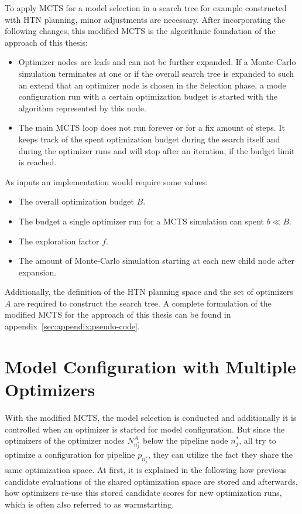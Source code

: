 To apply MCTS for a model selection in a search tree for example constructed with HTN planning, minor adjustments are necessary.
After incorporating the following changes, this modified MCTS is the algorithmic foundation of the approach of this thesis:
\begin{itemize}
    \item Optimizer nodes are leafs and can not be further expanded. If a Monte-Carlo simulation terminates at one or if the overall search tree is expanded to such an extend that an optimizer node is chosen in the Selection phase, a mode configuration run with a certain optimization budget is started with the algorithm represented by this node.
    \item The main MCTS loop does not run forever or for a fix amount of steps. It keeps track of the spent optimization budget during the search itself and during the optimizer runs and will stop after an iteration, if the budget limit is reached.
\end{itemize}
As inputs an implementation would require  some values:
\begin{itemize}
    \item The overall optimization budget $B$.
    \item The budget a single optimizer run for a MCTS simulation can spent $b \ll B$.
    \item The exploration factor $f$.
    \item The amount of Monte-Carlo simulation starting at each new child node after expansion.
\end{itemize}
Additionally, the definition of the HTN planning space and the set of optimizers $A$ are required to construct the search tree.
A complete formulation of the modified MCTS for the approach of this thesis can be found in appendix~\ref{sec:appendix:pseudo-code}.

\section{Model Configuration with Multiple Optimizers}
\label{sec:approach:configuration}
With the modified MCTS, the model selection is conducted and additionally it is controlled when an optimizer is started for model configuration.
But since the optimizers of the optimizer nodes $N^A_{n^*_j}$ below the pipeline node $n^*_j$, all try to optimize a configuration for pipeline $p_{n^*_j}$, they can utilize the fact they share the same optimization space.
At first, it is explained in the following how previous candidate evaluations of the shared optimization space are stored and afterwards, how optimizers re-use this stored candidate scores for new optimization runs, which is often also referred to as warmstarting.

